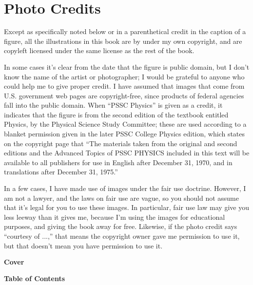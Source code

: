
\label{photocreditsappendix}%
\appendix\chapter{Photo Credits}
Except as specifically noted below or in a parenthetical credit in the
caption of a figure, all the illustrations in this book are by
under my own copyright, and are copyleft licensed under the same license
as the rest of the book. 

In some cases it's clear from the date that the
figure is public domain, but I don't know the name of the artist or photographer; I would
be grateful to anyone who could help me to give proper credit.
I have assumed that images
that come from U.S. government web pages are copyright-free, since products
of federal agencies fall into the public domain.
When ``PSSC Physics'' is given as a credit, it indicates that the figure
is from the second edition of the textbook entitled Physics, by the
Physical Science Study Committee; these are used according to a blanket
permission given in the later PSSC College Physics edition, which states
on the copyright page that ``The materials taken from the original and second
editions and the Advanced Topics of PSSC PHYSICS included in this text
will be available to all publishers for use in English after December 31, 1970,
and in translations after December 31, 1975.'' 

In a few cases, I have made use of images under the fair use doctrine. However,
I am not a lawyer, and the laws on fair use are vague, so you should not assume
that it's legal for you to use these images. In particular, fair use law may
give you less leeway than it gives me, because I'm using the images for
educational purposes, and giving the book away for free. Likewise, if the
photo credit says ``courtesy of ...,'' that means the copyright owner gave
me permission to use it, but that doesn't mean you have permission to use it.

\begin{sloppypar}
\noindent
\textbf{Cover}
\end{sloppypar}

\begin{sloppypar}
\noindent
\textbf{Table of Contents}
\end{sloppypar}

